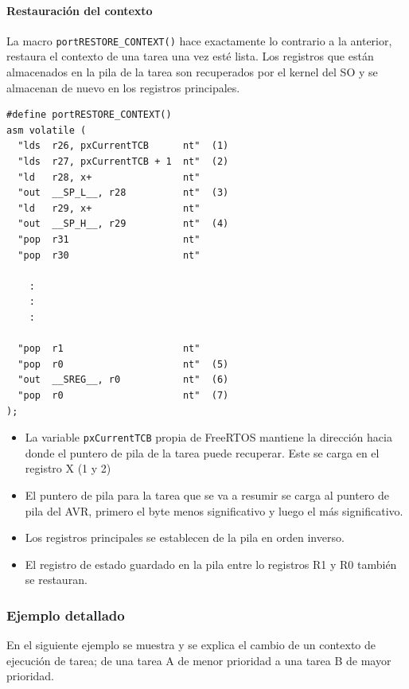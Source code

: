 \paragraph{Restauración del contexto}

La macro \texttt{portRESTORE\_CONTEXT()} hace exactamente lo contrario a la anterior, restaura el contexto de una tarea una vez esté lista. Los registros que están almacenados en la pila de la tarea son recuperados por el kernel del SO y se almacenan de nuevo en los registros principales.

\begin{verbatim}
#define portRESTORE_CONTEXT()        
asm volatile (	
  "lds  r26, pxCurrentTCB      nt"  (1)
  "lds  r27, pxCurrentTCB + 1  nt"  (2)
  "ld   r28, x+                nt"  
  "out  __SP_L__, r28          nt"  (3)
  "ld   r29, x+                nt"  
  "out  __SP_H__, r29          nt"  (4)
  "pop  r31                    nt" 
  "pop  r30                    nt" 

    :
    :
    :

  "pop  r1                     nt" 
  "pop  r0                     nt"  (5)
  "out  __SREG__, r0           nt"  (6)
  "pop  r0                     nt"  (7)
);

\end{verbatim}

\begin{itemize}
    \item La variable \texttt{pxCurrentTCB} propia de FreeRTOS mantiene la dirección hacia donde el puntero de pila de la tarea puede recuperar. Este se carga en el registro X (1 y 2)
    \item El puntero de pila para la tarea que se va a resumir se carga al puntero de pila del AVR, primero el byte menos significativo y luego el más significativo.
    \item Los registros principales se establecen de la pila en orden inverso. 
    \item El registro de estado guardado en la pila entre lo registros R1 y R0 también se restauran.
\end{itemize}

\subsubsection{Ejemplo detallado}

En el siguiente ejemplo se muestra y se explica el cambio de un contexto de ejecución de tarea; de una tarea A de menor prioridad a una tarea B de mayor prioridad.

